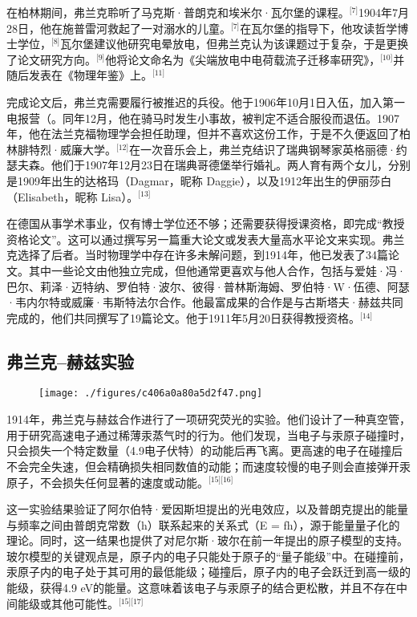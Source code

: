 在柏林期间，弗兰克聆听了马克斯·普朗克和埃米尔·瓦尔堡的课程。\(^\text{[7]}\)1904年7月28日，他在施普雷河救起了一对溺水的儿童。\(^\text{[7]}\)在瓦尔堡的指导下，他攻读哲学博士学位，\(^\text{[8]}\)瓦尔堡建议他研究电晕放电，但弗兰克认为该课题过于复杂，于是更换了论文研究方向。\(^\text{[9]}\)他将论文命名为《尖端放电中电荷载流子迁移率研究》，\(^\text{[10]}\)并随后发表在《物理年鉴》上。\(^\text{[11]}\)

完成论文后，弗兰克需要履行被推迟的兵役。他于1906年10月1日入伍，加入第一电报营（。同年12月，他在骑马时发生小事故，被判定不适合服役而退伍。1907年，他在法兰克福物理学会担任助理，但并不喜欢这份工作，于是不久便返回了柏林腓特烈·威廉大学。\(^\text{[12]}\)在一次音乐会上，弗兰克结识了瑞典钢琴家英格丽德·约瑟夫森。他们于1907年12月23日在瑞典哥德堡举行婚礼。两人育有两个女儿，分别是1909年出生的达格玛（Dagmar，昵称 Daggie），以及1912年出生的伊丽莎白（Elisabeth，昵称 Lisa）。\(^\text{[13]}\)

在德国从事学术事业，仅有博士学位还不够；还需要获得授课资格，即完成“教授资格论文”。这可以通过撰写另一篇重大论文或发表大量高水平论文来实现。弗兰克选择了后者。当时物理学中存在许多未解问题，到1914年，他已发表了34篇论文。其中一些论文由他独立完成，但他通常更喜欢与他人合作，包括与爱娃·冯·巴尔、莉泽·迈特纳、罗伯特·波尔、彼得·普林斯海姆、罗伯特·W·伍德、阿瑟·韦内尔特或威廉·韦斯特法尔合作。他最富成果的合作是与古斯塔夫·赫兹共同完成的，他们共同撰写了19篇论文。他于1911年5月20日获得教授资格。\(^\text{[14]}\)
\subsection{弗兰克–赫兹实验}
\begin{figure}[ht]
\centering
\texttt{[image: ./figures/c406a0a80a5d2f47.png]}
\caption{} \label{fig_ZMSflk_1}
\end{figure}
1914年，弗兰克与赫兹合作进行了一项研究荧光的实验。他们设计了一种真空管，用于研究高速电子通过稀薄汞蒸气时的行为。他们发现，当电子与汞原子碰撞时，只会损失一个特定数量（4.9电子伏特）的动能后再飞离。更高速的电子在碰撞后不会完全失速，但会精确损失相同数值的动能；而速度较慢的电子则会直接弹开汞原子，不会损失任何显著的速度或动能。\(^\text{[15][16]}\)

这一实验结果验证了阿尔伯特·爱因斯坦提出的光电效应，以及普朗克提出的能量与频率之间由普朗克常数（h）联系起来的关系式（E = fh），源于能量量子化的理论。同时，这一结果也提供了对尼尔斯·玻尔在前一年提出的原子模型的支持。玻尔模型的关键观点是，原子内的电子只能处于原子的“量子能级”中。在碰撞前，汞原子内的电子处于其可用的最低能级；碰撞后，原子内的电子会跃迁到高一级的能级，获得4.9 eV的能量。这意味着该电子与汞原子的结合更松散，并且不存在中间能级或其他可能性。\(^\text{[15][17]}\)

